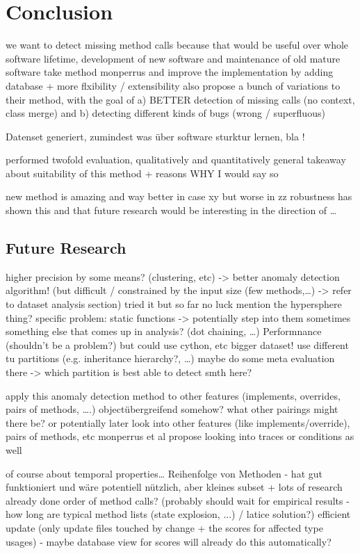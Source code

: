 \chapter{Conclusion}\label{ch:concl}

we want to detect missing method calls
because that would be useful over whole software lifetime, development of new software and maintenance of old mature software
take method monperrus and improve the implementation by adding database + more flxibility / extensibility
also propose a bunch of variations to their method, with the goal of a) BETTER detection of missing calls (no context, class merge)
and b) detecting different kinds of bugs (wrong / superfluous)

Datenset generiert, zumindest was über software sturktur lernen, bla !

performed twofold evaluation, qualitatively and quantitatively
general takeaway about suitability of this method + reasons WHY I would say so

new method is amazing and way better in case xy but worse in zz
robustness has shown this and that
future research would be interesting in the direction of \ldots


\section{Future Research}

higher precision by some means? (clustering, etc)
-> better anomaly detection algorithm! (but difficult / constrained by the input size (few methods,\ldots) -> refer to dataset analysis section)
    tried it but so far no luck
    mention the hypersphere thing?
specific problem: static functions -> potentially step into them sometimes
something else that comes up in analysis? (dot chaining, \ldots)
Performnance (shouldn't be a problem?)
    but could use cython, etc
bigger dataset!
use different tu partitions (e.g. inheritance hierarchy?, \ldots)
    maybe do some meta evaluation there -> which partition is best able to detect smth here?

apply this anomaly detection method to other features (implements, overrides, pairs of methods, \ldots.)
    objectübergreifend somehow?
    what other pairings might there be?
or potentially later look into other features (like implements/override), pairs of methods, etc
monperrus et al propose looking into traces or conditions as well

of course about temporal properties\ldots
Reihenfolge von Methoden - hat gut funktioniert und wäre potentiell nützlich, aber kleines subset + lots of research already done
order of method calls? (probably should wait for empirical results - how long are typical method lists (state explosion, ...) / latice solution?)
efficient update (only update files touched by change + the scores for affected type usages) - maybe database view for scores will already do this automatically? 


